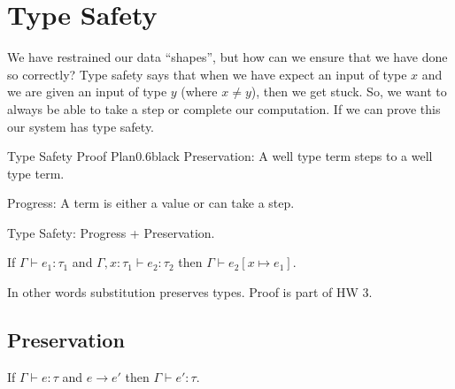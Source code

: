 \documentclass{lecturenotes}
\newenvironment{theorem}[2][Theorem]{\begin{trivlist}
\item[\hskip \labelsep {\bfseries #1}\hskip \labelsep {\bfseries #2.}]}{\end{trivlist}}
\newenvironment{lemma}[2][Lemma]{\begin{trivlist}
\item[\hskip \labelsep {\bfseries #1}\hskip \labelsep {\bfseries #2.}]}{\end{trivlist}}
\begin{document}
\section{Type Safety}

We have restrained our data ``shapes'', but how can we ensure that we have done so correctly? 
  Type safety says that when we have expect an input of type $x$ and we are given an input of type $y$ (where $ x \neq y$), then we get stuck. 
  So, we want to always be able to take a step or complete our computation. 
  If we can prove this our system has type safety.

\begin{center}
\begin{alert}{Type Safety Proof Plan}{0.6\textwidth}{black}
  Preservation: A well type term steps to a well type term.

  Progress: A term is either a value or can take a step. 

  Type Safety: Progress + Preservation.   
\end{alert}
\end{center}

\begin{lemma}{Preservation of Substitution}
  If $\Gamma \vdash e_1 : \tau_1$ and $\Gamma, x : \tau_1 \vdash e_2 : \tau_2$ then $\Gamma \vdash e_2 [x \mapsto e_1]$. 
\end{lemma}

In other words substitution preserves types. 
  Proof is part of HW 3. 

\subsection{Preservation}

\begin{theorem}{Preservation}
   If $\Gamma \vdash e : \tau$ and $e \rightarrow e'$ then $\Gamma \vdash e' : \tau$. 
\end{theorem}
\end{document}
